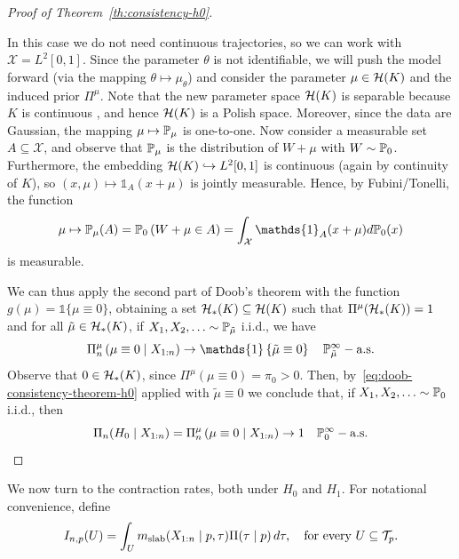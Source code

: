 \begin{proof}[Proof of Theorem~\ref{th:consistency-h0}]\label{proof:consistency-h0}

In this case we do not need continuous trajectories, so we can work with \(\mathcal X = L^2[0,1]\). Since the parameter \(\theta\) is not identifiable, we will push the model forward (via the mapping \(\theta \mapsto \mu_\theta\)) and consider the parameter \(\mu\in\mathcal{H}(K)\) and the induced prior \(\Pi^\mu\). Note that the new parameter space \(\mathcal{H}(K)\) is separable because \(K\) is continuous \citep[Corollary~4]{berlinet2004reproducing}, and hence \(\mathcal{H}(K)\) is a Polish space. Moreover, since the data are Gaussian, the mapping \(\mu\mapsto \mathbb{P}_\mu\) is one-to-one. Now consider a measurable set \(A\subseteq\mathcal X\), and observe that \(\mathbb{P}_\mu\) is the distribution of \(W + \mu\) with \(W\sim \mathbb{P}_0\). Furthermore, the embedding \(\mathcal{H}(K) \hookrightarrow L^2[0,1]\) is continuous (again by continuity of \(K\)), so \((x,\mu) \mapsto \mathds{1}_A(x+\mu)\) is jointly measurable. Hence, by Fubini/Tonelli, the function
\[
\mu \mapsto \pp_\mu(A) = \pp_0\left(W+\mu \in A\right) = \int_{\mathcal X} \mathds{1}_A(x+\mu) d\pp_0(x)
\]
is measurable.

We can thus apply the second part of Doob's theorem with the function \(g(\mu)=\mathds{1}\{\mu\equiv 0\}\), obtaining a set \(\mathcal{H}_*(K)\subseteq \mathcal{H}(K)\) such that \(\Pi^\mu(\mathcal{H}_*(K))=1\) and for all \(\tilde{\mu}\in \mathcal{H}_*(K)\), if \(X_1,X_2,\ldots \sim \mathbb{P}_{\tilde{\mu}}\) i.i.d., we have
\begin{equation}\label{eq:doob-consistency-theorem-h0}
  \Pi_n^\mu\left(\mu\equiv 0\mid X_{1:n}\right) \to \mathds{1}\left\{\tilde{\mu}\equiv 0\right\}\quad \pp_{\tilde{\mu}}^\infty-\text{a.s.}
\end{equation}
Observe that \(0\in \mathcal{H}_*(K)\), since \(\Pi^\mu(\mu\equiv 0)=\pi_0>0\). Then, by~\eqref{eq:doob-consistency-theorem-h0} applied with \(\tilde{\mu}\equiv 0\) we conclude that, if \(X_1, X_2,\ldots \sim \mathbb{P}_0\) i.i.d., then
\[
  \Pi_n(H_0\mid X_{1:n}) = \Pi_n^\mu\left(\mu\equiv 0\mid X_{1:n}\right) \to 1\quad \mathbb{P}_0^\infty-\text{a.s.}
\]
\end{proof}

We now turn to the contraction rates, both under \(H_0\) and \(H_1\). For notational convenience, define
\[
I_{n,p}(U) = \int_U m_{\text{slab}}(X_{1:n}\mid p, \tau)\Pi(\tau\mid p)\, d\tau, \quad \text{for every } U\subseteq \mathcal T_p.
\]

